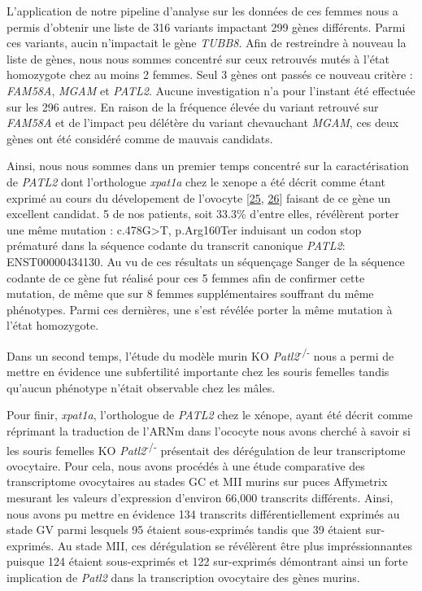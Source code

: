 \documentclass[12pt,twoside]{ugathesis}
\begin{document}
L'application de notre pipeline d'analyse sur les données de ces femmes
nous a permis d'obtenir une liste de 316 variants impactant 299 gènes
différents. Parmi ces variants, aucin n'impactait le gène \emph{TUBB8}.
Afin de restreindre à nouveau la liste de gènes, nous nous sommes
concentré sur ceux retrouvés mutés à l'état homozygote chez au moins 2
femmes. Seul 3 gènes ont passés ce nouveau critère : \emph{FAM58A},
\emph{MGAM} et \emph{PATL2}. Aucune investigation n'a pour l'instant été
effectuée sur les 296 autres. En raison de la fréquence élevée du
variant retrouvé sur \emph{FAM58A} et de l'impact peu délétère du
variant chevauchant \emph{MGAM}, ces deux gènes ont été considéré comme
de mauvais candidats.

Ainsi, nous nous sommes dans un premier temps concentré sur la
caractérisation de \emph{PATL2} dont l'orthologue \emph{xpat1a} chez le
xenope a été décrit comme étant exprimé au cours du dévelopement de
l'ovocyte {[}\protect\hyperlink{ref-Marnef2010}{25},
\protect\hyperlink{ref-Nakamura2010}{26}{]} faisant de ce gène un
excellent candidat. 5 de nos patients, soit 33.3\% d'entre elles,
révélèrent porter une même mutation : c.478G\textgreater{}T, p.Arg160Ter
induisant un codon stop prématuré dans la séquence codante du transcrit
canonique \emph{PATL2}: ENST00000434130. Au vu de ces résultats un
séquençage Sanger de la séquence codante de ce gène fut réalisé pour ces
5 femmes afin de confirmer cette mutation, de même que sur 8 femmes
supplémentaires souffrant du même phénotypes. Parmi ces dernières, une
s'est révélée porter la même mutation à l'état homozygote.

Dans un second temps, l'étude du modèle murin KO
\emph{Patl2}\textsuperscript{-/-} nous a permi de mettre en évidence une
subfertilité importante chez les souris femelles tandis qu'aucun
phénotype n'était observable chez les mâles.

Pour finir, \emph{xpat1a}, l'orthologue de \emph{PATL2} chez le xénope,
ayant été décrit comme réprimant la traduction de l'ARNm dans l'ococyte
nous avons cherché à savoir si les souris femelles KO
\emph{Patl2}\textsuperscript{-/-} présentait des dérégulation de leur
transcriptome ovocytaire. Pour cela, nous avons procédés à une étude
comparative des transcriptome ovocytaires au stades GC et MII murins sur
puces Affymetrix mesurant les valeurs d'expression d'environ 66,000
transcrits différents. Ainsi, nous avons pu mettre en évidence 134
transcrits différentiellement exprimés au stade GV parmi lesquels 95
étaient sous-exprimés tandis que 39 étaient sur-exprimés. Au stade MII,
ces dérégulation se révélèrent être plus impréssionnantes puisque 124
étaient sous-exprimés et 122 sur-exprimés démontrant ainsi un forte
implication de \emph{Patl2} dans la transcription ovocytaire des gènes
murins.
\end{document}
